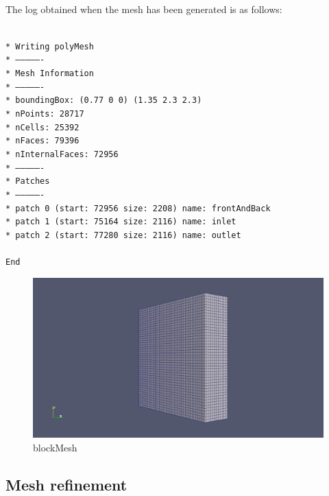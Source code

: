 \paragraph{}The log obtained when the mesh has been generated is as follows:

\texttt{\\*
Writing polyMesh\\*
----------------\\*
Mesh Information\\*
----------------\\*
  boundingBox: (0.77 0 0) (1.35 2.3 2.3)\\*
  nPoints: 28717\\*
  nCells: 25392\\*
  nFaces: 79396\\*
  nInternalFaces: 72956\\*
----------------\\*
Patches\\*
----------------\\*
  patch 0 (start: 72956 size: 2208) name: frontAndBack\\*
  patch 1 (start: 75164 size: 2116) name: inlet\\*
  patch 2 (start: 77280 size: 2116) name: outlet\\
  \\
  End
}

\begin{figure}[h!]
\includegraphics[scale=0.26]{./mesh/screenshots/blockmesh}
\centering
\caption{blockMesh}
\end{figure}

\subsection{Mesh refinement}


